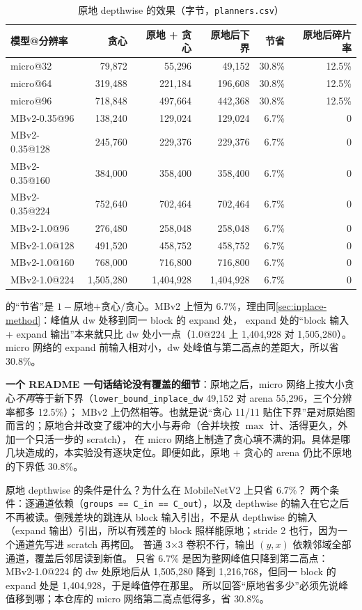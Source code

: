 \documentclass[11pt,a4paper]{ctexart}
\begin{document}
\begin{table}[H]
\centering\small
\caption{原地 depthwise 的效果（字节，\texttt{planners.csv}）}\label{tab:inplace}
\begin{tabular}{lrrrrr}
\toprule
模型@分辨率 & 贪心 & 原地 + 贪心 & 原地后下界 & 节省 & 原地后碎片率 \\
\midrule
micro@32 & 79,872 & 55,296 & 49,152 & 30.8\% & 12.5\% \\
micro@64 & 319,488 & 221,184 & 196,608 & 30.8\% & 12.5\% \\
micro@96 & 718,848 & 497,664 & 442,368 & 30.8\% & 12.5\% \\
MBv2-0.35@96 & 138,240 & 129,024 & 129,024 & 6.7\% & 0 \\
MBv2-0.35@128 & 245,760 & 229,376 & 229,376 & 6.7\% & 0 \\
MBv2-0.35@160 & 384,000 & 358,400 & 358,400 & 6.7\% & 0 \\
MBv2-0.35@224 & 752,640 & 702,464 & 702,464 & 6.7\% & 0 \\
MBv2-1.0@96 & 276,480 & 258,048 & 258,048 & 6.7\% & 0 \\
MBv2-1.0@128 & 491,520 & 458,752 & 458,752 & 6.7\% & 0 \\
MBv2-1.0@160 & 768,000 & 716,800 & 716,800 & 6.7\% & 0 \\
MBv2-1.0@224 & 1,505,280 & 1,404,928 & 1,404,928 & 6.7\% & 0 \\
\bottomrule
\end{tabular}
\end{table}

的“节省”是 $1 - \text{原地+贪心}/\text{贪心}$。MBv2 上恒为 6.7\%，理由同\cref{sec:inplace-method}：峰值从 dw 处移到同一 block 的 expand 处，
expand 处的“block 输入 + expand 输出”本来就只比 dw 处小一点（1.0@224 上 1,404,928 对 1,505,280）。
micro 网络的 expand 前输入相对小，dw 处峰值与第二高点的差距大，所以省 30.8\%。

\textbf{一个 README 一句话结论没有覆盖的细节}：原地之后，micro 网络上按大小贪心\emph{不再}等于新下界（\texttt{lower\_bound\_inplace\_dw} 49,152 对 arena 55,296，三个分辨率都多 12.5\%）；
MBv2 上仍然相等。也就是说“贪心 11/11 贴住下界”是对原始图而言的；原地合并改变了缓冲的大小与寿命（合并块按 $\max$ 计、活得更久，外加一个只活一步的 scratch），
在 micro 网络上制造了贪心填不满的洞。具体是哪几块造成的，本实验没有逐块定位。即便如此，原地 + 贪心的 arena 仍比不原地的下界低 30.8\%。

\begin{iqbox}{原地 depthwise 的条件是什么？为什么在 MobileNetV2 上只省 6.7\%？}
两个条件：逐通道依赖（\texttt{groups == C\_in == C\_out}），以及 depthwise 的输入在它之后不再被读。倒残差块的跳连从 block 输入引出，不是从 depthwise 的输入（expand 输出）引出，所以有残差的 block 照样能原地；stride 2 也行，因为一个通道先写进 scratch 再拷回。
普通 3×3 卷积不行，输出 $(y,x)$ 依赖邻域全部通道，覆盖后邻居读到新值。
只省 6.7\% 是因为整网峰值只降到第二高点：MBv2-1.0@224 的 dw 处原地后从 1,505,280 降到 1,216,768，但同一 block 的 expand 处是 1,404,928，于是峰值停在那里。
所以回答“原地省多少”必须先说峰值移到哪；本仓库的 micro 网络第二高点低得多，省 30.8\%。
\end{iqbox}
\end{document}
